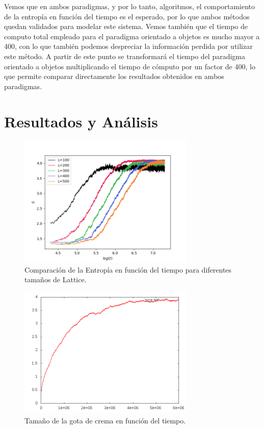 \documentclass[12pt,twocolumn]{article}
\begin{document}
Vemos que en ambos paradigmas, y por lo tanto, algoritmos, el comportamiento de la entropía 
en función del tiempo es el esperado, por lo que ambos métodos quedan validados para modelar 
este sistema. Vemos también que el tiempo de computo total empleado para el paradigma orientado 
a objetos es mucho mayor a 400, con lo que también podemos despreciar la información perdida 
por utilizar este método. A partir de este punto se transformará el tiempo del paradigma 
orientado a objetos multiplicando el tiempo de cómputo por un factor de 400, lo que permite 
comparar directamente los resultados obtenidos en ambos paradigmas.

\section{Resultados y Análisis}

\begin{figure}
    \centering
    \includegraphics[width=0.75\textwidth]{figs/S_vs_t_sizes.png}
    \caption{Comparación de la Entropía en función del tiempo para diferentes tamaños de Lattice.}
    \label{fig:S_vs_t_sizes}
\end{figure}

\begin{figure}
    \centering
    \includegraphics[width=0.75\textwidth]{figs/size.png}
    \caption{Tamaño de la gota de crema en función del tiempo.}
    \label{fig:size}
\end{figure}
\end{document}
